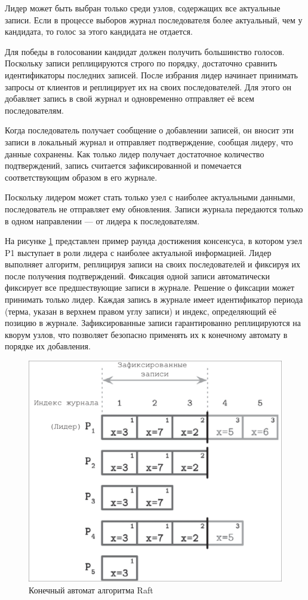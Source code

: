 Лидер может быть выбран только среди узлов, содержащих все актуальные записи.
Если в процессе выборов журнал последователя более актуальный, чем у кандидата,
то голос за этого кандидата не отдается.

Для победы в голосовании кандидат должен получить большинство голосов. Поскольку
записи реплицируются строго по порядку, достаточно сравнить идентификаторы последних
записей. После избрания лидер начинает принимать запросы от клиентов и реплицирует
их на своих последователей. Для этого он добавляет запись в свой журнал и
одновременно отправляет её всем последователям.

Когда последователь получает сообщение о добавлении записей, он вносит эти
записи в локальный журнал и отправляет подтверждение, сообщая лидеру, что данные
сохранены. Как только лидер получает достаточное количество подтверждений, запись
считается зафиксированной и помечается соответствующим образом в его журнале.

Поскольку лидером может стать только узел с наиболее актуальными данными,
последователь не отправляет ему обновления. Записи журнала передаются
только в одном направлении — от лидера к последователям.

На рисунке \ref{fig:raft-consensus} представлен пример раунда достижения
консенсуса, в котором узел P1 выступает в роли лидера с наиболее актуальной
информацией. Лидер выполняет алгоритм, реплицируя записи на своих последователей
и фиксируя их после получения подтверждений. Фиксация одной записи автоматически
фиксирует все предшествующие записи в журнале. Решение о фиксации может принимать
только лидер. Каждая запись в журнале имеет идентификатор периода (терма, указан в
верхнем правом углу записи) и индекс, определяющий её позицию в журнале.
Зафиксированные записи гарантированно реплицируются на кворум узлов, что
позволяет безопасно применять их к конечному автомату в порядке их добавления.

\begin{figure}
  \centering
  \includegraphics[scale=0.4]{inc/raft-consensus.png}
  \caption{Конечный автомат алгоритма Raft}
  \label{fig:raft-consensus}
\end{figure}


